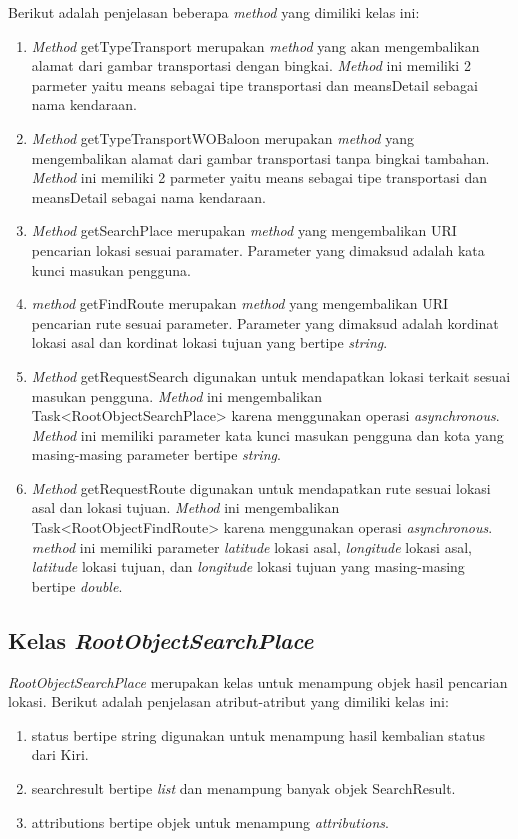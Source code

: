 Berikut adalah penjelasan beberapa \textit{method} yang dimiliki kelas ini:
\begin{enumerate}
	\item \textit{Method} getTypeTransport merupakan \textit{method} yang akan mengembalikan alamat dari gambar transportasi dengan bingkai. \textit{Method} ini memiliki 2 parmeter yaitu means sebagai tipe transportasi dan meansDetail sebagai nama kendaraan.
	\item \textit{Method} getTypeTransportWOBaloon merupakan \textit{method} yang mengembalikan alamat dari gambar transportasi tanpa bingkai tambahan. \textit{Method} ini memiliki 2 parmeter yaitu means sebagai tipe transportasi dan meansDetail sebagai nama kendaraan.
	\item \textit{Method} getSearchPlace merupakan \textit{method} yang mengembalikan URI pencarian lokasi sesuai paramater. Parameter yang dimaksud adalah kata kunci masukan pengguna.
	\item \textit{method} getFindRoute merupakan \textit{method} yang mengembalikan URI pencarian rute sesuai parameter. Parameter yang dimaksud adalah kordinat lokasi asal dan kordinat lokasi tujuan yang bertipe \textit{string}.
	\item \textit{Method} getRequestSearch digunakan untuk mendapatkan lokasi terkait sesuai masukan pengguna. \textit{Method} ini mengembalikan Task<RootObjectSearchPlace> karena menggunakan operasi \textit{asynchronous}. \textit{Method} ini memiliki parameter kata kunci masukan pengguna dan kota yang masing-masing parameter bertipe \textit{string}.
		\item \textit{Method} getRequestRoute digunakan untuk mendapatkan rute sesuai lokasi asal dan lokasi tujuan. \textit{Method} ini mengembalikan Task<RootObjectFindRoute> karena menggunakan operasi \textit{asynchronous}. \textit{method} ini memiliki parameter \textit{latitude} lokasi asal, \textit{longitude} lokasi asal, \textit{latitude} lokasi tujuan, dan \textit{longitude} lokasi tujuan yang masing-masing bertipe \textit{double}.
\end{enumerate}

\subsection{Kelas \textit{RootObjectSearchPlace}}
\label{lab:Kelas RootObjectSearchPlace}
\hspace{0.5cm} \textit{RootObjectSearchPlace} merupakan kelas untuk menampung objek hasil pencarian lokasi. Berikut adalah penjelasan atribut-atribut yang dimiliki kelas ini:
\begin{enumerate}
	\item status bertipe string digunakan untuk menampung hasil kembalian status dari Kiri.
	\item searchresult bertipe \textit{list} dan menampung banyak objek SearchResult. 
	\item attributions bertipe objek untuk menampung \textit{attributions}.
\end{enumerate}


